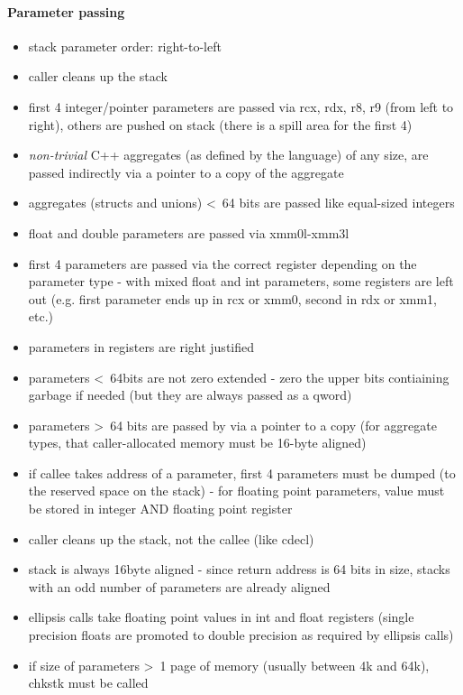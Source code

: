 \paragraph{Parameter passing}

\begin{itemize}
\item stack parameter order: right-to-left
\item caller cleans up the stack
\item first 4 integer/pointer parameters are passed via rcx, rdx, r8, r9 (from left to right), others are pushed on stack (there is a
spill area for the first 4)
\item {\it non-trivial} C++ aggregates (as defined by the language) of any size, are passed indirectly via a pointer to a copy of the aggregate
\item aggregates (structs and unions) \textless\ 64 bits are passed like equal-sized integers
\item float and double parameters are passed via xmm0l-xmm3l
\item first 4 parameters are passed via the correct register depending on the parameter type - with mixed float and int parameters,
some registers are left out (e.g. first parameter ends up in rcx or xmm0, second in rdx or xmm1, etc.)
\item parameters in registers are right justified
\item parameters \textless\ 64bits are not zero extended - zero the upper bits contiaining garbage if needed (but they are always
passed as a qword)
\item parameters \textgreater\ 64 bits are passed by via a pointer to a copy (for aggregate types, that caller-allocated memory must be 16-byte aligned)
\item if callee takes address of a parameter, first 4 parameters must be dumped (to the reserved space on the stack) - for
floating point parameters, value must be stored in integer AND floating point register
\item caller cleans up the stack, not the callee (like cdecl)
\item stack is always 16byte aligned - since return address is 64 bits in size, stacks with an odd number of parameters are
already aligned
\item ellipsis calls take floating point values in int and float registers (single precision floats are promoted to double precision as
required by ellipsis calls)
\item if size of parameters \textgreater\ 1 page of memory (usually between 4k and 64k), chkstk must be called
\end{itemize}



